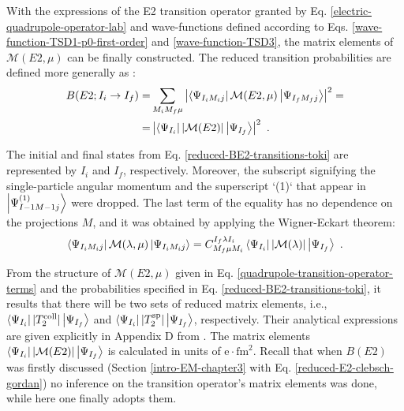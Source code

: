 With the expressions of the E2 transition operator granted by Eq. \ref{electric-quadrupole-operator-lab} and wave-functions defined according to Eqs. \ref{wave-function-TSD1-p0-first-order} and \ref{wave-function-TSD3}, the matrix elements of $\mathcal{M}(E2,\mu)$ can be finally constructed. The reduced transition probabilities are defined more generally as \cite{toki1975asymmetric}:
\begin{align}
    B(E2;I_i\to I_f)=&\sum_{M_iM_f\mu}\left|\bra{\Psi_{I_iM_ij}}\mathcal{M}(E2,\mu)\ket{\Psi_{I_fM_fj}}\right|^2=\nonumber\\
                                            =&\left|\bra{\Psi_{I_i}}\left|\mathcal{M}(E2)\right|\ket{\Psi_{I_f}}\right|^2\ .
    \label{reduced-BE2-transitions-toki}
\end{align}

The initial and final states from Eq. \ref{reduced-BE2-transitions-toki} are represented by $I_i$ and $I_f$, respectively. Moreover, the subscript signifying the single-particle angular momentum and the superscript `(1)` that appear in $\ket{\Psi_{I-1M-1j}^{(1)}}$ were dropped. The last term of the equality has no dependence on the projections $M$, and it was obtained by applying the Wigner-Eckart theorem:
\begin{align}
    \bra{\Psi_{I_iM_ij}}\mathcal{M}(\lambda,\mu)\ket{\Psi_{I_iM_ij}}=C_{M_f\mu M_i}^{I_f\lambda I_i}\bra{\Psi_{I_i}}|\mathcal{M}(\lambda)|\ket{\Psi_{I_f}}\ .
\end{align}  

From the structure of $\mathcal{M}(E2,\mu)$ given in Eq. \ref{quadrupole-transition-operator-terms} and the probabilities specified in Eq. \ref{reduced-BE2-transitions-toki}, it results that there will be two sets of reduced matrix elements, i.e., $\bra{\Psi_{I_i}}|T_2^\text{coll}|\ket{\Psi_{I_f}}$ and $\bra{\Psi_{I_i}}|T_2^\text{sp}|\ket{\Psi_{I_f}}$, respectively.  Their analytical expressions are given explicitly in Appendix D from \cite{raduta2017semiclassical}. The matrix elements $\bra{\Psi_{I_i}}|\mathcal{M}(E2)|\ket{\Psi_{I_f}}$ is calculated in units of $\mathrm{e}\cdot\text{fm}^2$. Recall that when $B(E2)$ was firstly discussed (Section \ref{intro-EM-chapter3} with Eq. \ref{reduced-E2-clebsch-gordan}) no inference on the transition operator's matrix elements was done, while here one finally adopts them.

